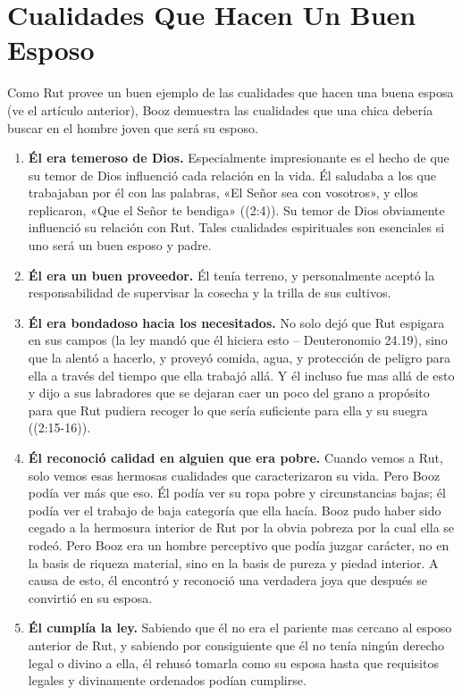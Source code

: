 \documentclass[12pt, twoside, openright]{book}
\begin{document}
\section{Cualidades Que Hacen Un Buen Esposo}
Como Rut provee un buen ejemplo de las cualidades que hacen una buena esposa (ve el artículo anterior), Booz demuestra las cualidades que una chica debería buscar en el hombre joven que será su esposo.

\begin{enumerate}
\item \textbf{Él era temeroso de Dios.} Especialmente impresionante es el hecho de que su temor de Dios influenció cada relación en la vida. Él saludaba a los que trabajaban por él con las palabras, «El Señor sea con vosotros», y ellos replicaron, «Que el Señor te bendiga» ((2:4)). Su temor de Dios obviamente influenció su relación con Rut. Tales cualidades espirituales son esenciales si uno será un buen esposo y padre. 
\item \textbf{Él era un buen proveedor.} Él tenía terreno, y personalmente aceptó la responsabilidad de supervisar la cosecha y la trilla de sus cultivos.
\item \textbf{Él era bondadoso hacia los necesitados.} No solo dejó que Rut espigara en sus campos (la ley mandó que él hiciera esto – Deuteronomio 24.19), sino que la alentó a hacerlo, y proveyó comida, agua, y protección de peligro para ella a través del tiempo que ella trabajó allá. Y él incluso fue mas allá de esto y dijo a sus labradores que se dejaran caer un poco del grano a propósito para que Rut pudiera recoger lo que sería suficiente para ella y su suegra ((2:15-16)).
\item \textbf{Él reconoció calidad en alguien que era pobre.} Cuando vemos a Rut, solo vemos esas hermosas cualidades que caracterizaron su vida. Pero Booz podía ver más que eso. Él podía ver su ropa pobre y circunstancias bajas; él podía ver el trabajo de baja categoría que ella hacía. Booz pudo haber sido cegado a la hermosura interior de Rut por la obvia pobreza por la cual ella se rodeó. Pero Booz era un hombre perceptivo que podía juzgar carácter, no en la basis de riqueza material, sino en la basis de pureza y piedad interior.
A causa de esto, él encontró y reconoció una verdadera joya que después se convirtió en su esposa.
\item \textbf{Él cumplía la ley.} Sabiendo que él no era el pariente mas cercano al esposo anterior de Rut, y sabiendo por consiguiente que él no tenía ningún derecho legal o divino a ella, él rehusó tomarla como su esposa hasta que requisitos legales y divinamente ordenados podían cumplirse.


\end{enumerate}
\end{document}
